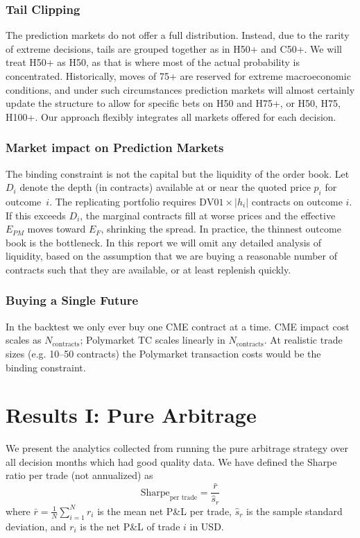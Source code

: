 \subsubsection{Tail Clipping}
The prediction markets do not offer a full distribution. Instead, due to the rarity of extreme decisions, tails are grouped together as in H50+ and C50+. We will treat H50+ as H50, as that is where most of the actual probability is concentrated. Historically, moves of 75+ are reserved for extreme macroeconomic conditions, and under such circumstances prediction markets will almost certainly update the structure to allow for specific bets on H50 and H75+, or H50, H75, H100+. Our approach flexibly integrates all markets offered for each decision.

\subsubsection{Market impact on Prediction Markets}

The binding constraint is not the capital but the liquidity of the order book. Let $D_i$ denote the depth (in contracts) available at or near the quoted price $p_i$ for outcome~$i$. The replicating portfolio requires $\mathrm{DV01} \times |h_i|$
contracts on outcome $i$. If this exceeds $D_i$, the marginal contracts fill at worse prices and the effective $E_{PM}$ moves toward $E_F$, shrinking the spread. In practice, the thinnest outcome book is the bottleneck. In this report we will omit any detailed analysis of liquidity, based on the assumption that we are buying a reasonable number of contracts such that they are available, or at least replenish quickly.

\subsubsection{Buying a Single Future}
In the backtest we only ever buy one CME contract at a time. CME impact cost scales as $N_\text{contracts}$; Polymarket TC scales linearly in $N_\text{contracts}$. At realistic trade sizes (e.g. 10–50 contracts) the Polymarket transaction costs would be the binding constraint.

\section{Results I: Pure Arbitrage}

We present the analytics collected from running the pure arbitrage strategy over all decision months which had good quality data. We have defined the Sharpe ratio per trade (not annualized) as 
\[
\text{Sharpe}_{\text{per trade}} = \frac{\bar{r}}{\hat{s}_r}
\]
where $\bar{r} = \frac{1}{N}\sum_{i=1}^{N} r_i$ is the mean net P\&L per trade, $\hat{s}_r$ is the sample standard deviation, and $r_i$ is the net P\&L of trade $i$ in USD.

